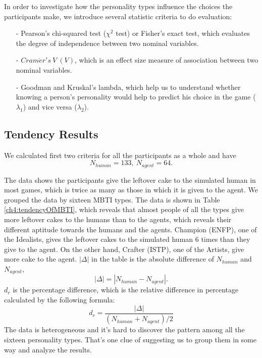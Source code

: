 In order to investigate how the personality types influence the choices the participants make, we introduce several statistic criteria to do evaluation: 
\begin{itemize}
\item[-]Pearson's chi-squared test ($\chi^{2}$ test) or Fisher's exact test, which evaluates the degree of independence between two nominal variables. 
\item[-]$Cram\acute{e}r's\:V\:(V)$, which is an effect size measure of association between two nominal variables.
\item[-]Goodman and Kruskal's lambda, which help us to understand whether knowing a person's personality would help to predict his choice in the game ($\lambda_{1}$) and vice versa ($\lambda_{2}$).
\end{itemize}  

\subsection{Tendency Results}
We calculated first two criteria for all the participants as a whole and have 
\begin{equation}
N_{human}=133,\:N_{agent}=64.
\end{equation} 

The data shows the participants give the leftover cake to the simulated human in most games, which is twice as many as those in which it is given to the agent. We grouped the data by sixteen MBTI types. The data is shown in Table \ref{ch4:tendencyOfMBTI}, which reveals that almost people of all the types give more leftover cakes to the humans than to the agents, which reveals their different aptitude towards the humans and the agents. Champion (ENFP), one of the Idealists, gives the leftover cakes to the simulated human 6 times than they give to the agent. On the other hand, Crafter (ISTP), one of the Artists, give more cake to the agent. $|\Delta|$ in the table is the absolute difference of $N_{human}$ and $N_{agent}$,
\begin{equation}
|\Delta|=|N_{human}-N_{agent}|.
\end{equation}
$d_r$ is the percentage difference, which is the relative difference in percentage calculated by the following formula:
\begin{equation}
d_r=\dfrac{|\Delta|}{(N_{human}+N_{agent})/2}
\end{equation}
The data is heterogeneous and it's hard to discover the pattern among all the sixteen personality types. That's one clue of suggesting us to group them in some way and analyze the results.

